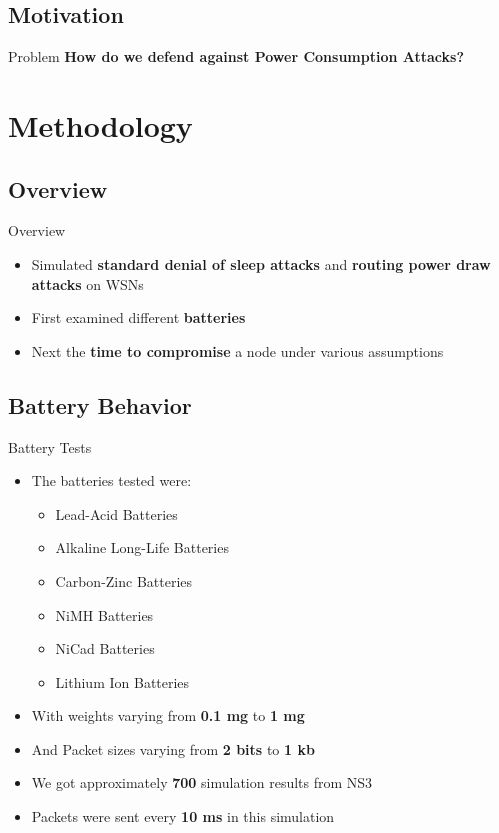 \documentclass{beamer}
\begin{document}

\subsection{Motivation}

\begin{frame}{Problem}
\centering
\textbf{\huge{How do we defend against Power Consumption Attacks?}}	
\end{frame}

\section{Methodology}

\subsection{Overview}
\begin{frame}{Overview}
\begin{itemize}
	\item Simulated \textbf{standard denial of sleep attacks} and \textbf{routing power draw attacks} on WSNs
	\item First examined different \textbf{batteries}
	\item Next the \textbf{time to compromise} a node under various assumptions
\end{itemize}
\end{frame}
\subsection{Battery Behavior}

\begin{frame}{Battery Tests}
\begin{itemize}

	\item The batteries tested were: 
	\begin{itemize}
	  \item Lead-Acid Batteries
	  \item Alkaline Long-Life Batteries
	  \item Carbon-Zinc Batteries
	  \item NiMH Batteries
	  \item NiCad Batteries
	  \item Lithium Ion Batteries
	\end{itemize}
	\item With weights varying from \textbf{0.1 mg} to \textbf{1 mg}
	\item And Packet sizes varying from \textbf{2 bits} to \textbf{1 kb}
	\item We got approximately \textbf{700} simulation results from NS3
	\item Packets were sent every \textbf{10 ms} in this simulation
\end{itemize}
\end{frame}
\end{document}

